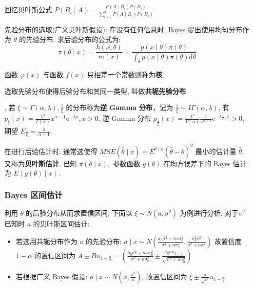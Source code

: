 \documentclass[10pt]{yerbaformat}
\begin{document}
\par 回忆贝叶斯公式 $P\left(B_{i} \mid A\right)=\frac{P\left(A \mid B_{i}\right) P\left(B_{i}\right)}{\sum_{i=1}^{n} P\left(A \mid B_{i}\right) P\left(B_{i}\right)}$

\par 先验分布的选取(广义贝叶斯假设): 在没有任何信息时, Bayes 提出使用均匀分布作为 $\theta$ 的先验分布. 求后验分布的公式为: $$\pi(\theta \mid x)=\frac{h(x, \theta)}{m(x)}=\frac{p(x \mid \theta) \pi(\theta)}{\int_{\theta} p(x \mid \theta) \pi(\theta) \mathrm{d} \theta}$$

\begin{definition}
    函数 $\varphi(x)$ 与函数 $f(x)$ 只相差一个常数则称为\textbf{核}.
\end{definition}

\begin{definition}
    选取先验分布使得后验分布和其同一类型, 叫做\textbf{共轭先验分布}
\end{definition}

\par , 若 $\xi \sim \Gamma(\alpha, \lambda), \frac{1}{\xi}$ 的分布称为\textbf{逆 Gamma 分布}，记为 $\frac{1}{\xi} \sim I \Gamma(\alpha, \lambda)$, 有 $p_{\xi}(x)=\frac{\lambda^{\alpha}}{\Gamma(\alpha)} x^{\alpha-1} \mathrm{e}^{-\lambda x}, x>0$, 逆 Gamma 分布
$p_{\frac{1}{\xi}}(x)=\frac{\lambda^{\alpha}}{\Gamma(\alpha)} \frac{1}{x^{\alpha+1}} \mathrm{e}^{-\lambda \frac{1}{x}, x}>0$, 期望 $E \frac{1}{\xi}=\frac{\lambda}{\alpha-1}$.

\par 在进行后验估计时. 通常选使得 $MSE(\hat{\theta} \mid x)=E^{\theta \mid x}(\hat{\theta}-\theta)^{2}$ 最小的估计量 $\hat{\theta}$, 又称为\textbf{贝叶斯估计}. 已知 $\pi(\theta \mid x),$ 参数函数 $g(\theta)$ 在均方误差下的 Bayes 估计为 $E(g(\theta) \mid x)$.

\subsubsection{Bayes 区间估计}

\par 利用 $\theta$ 的后验分布从而求置信区间, 下面以 $\xi \sim N\left(a, \sigma^{2}\right)$ 为例进行分析. 对于$\sigma^{2}$ 已知时 $a$ 的贝叶斯区间估计:

\begin{itemize}
    \item 若选用共轭分布作为 $a$ 的先验分布: $a \mid x \sim N\left(\frac{a_{0} \sigma^{2}+n \bar{x} \sigma_{0}^{2}}{\sigma^{2}+n \sigma_{0}^{2}}, \frac{\sigma_{0}^{2} \sigma^{2}}{\sigma^{2}+n \sigma_{0}^{2}}\right)$ 故置信度 $1-\alpha$ 的置信区间为 $A \pm B u_{1-\frac{\alpha}{2}}=\left(\frac{a_{0} \sigma^{2}+n \bar{x} \sigma_{0}^{2}}{\sigma^{2}+n \sigma_{0}^{2}} \pm \frac{\sigma_{0} \sigma u_{1-\frac{\alpha}{2}}}{\sqrt{\sigma^{2}+n \sigma_{0}^{2}}}\right)$
    \item 若根据广义 Bayes 假设: $a \mid x \sim N\left(\bar{x}, \frac{\sigma^{2}}{n}\right)$, 故置信区间为 $\bar{\xi} \pm \frac{\sigma}{\sqrt{n}} u_{1-\frac{\alpha}{2}}$
\end{itemize}
\end{document}

